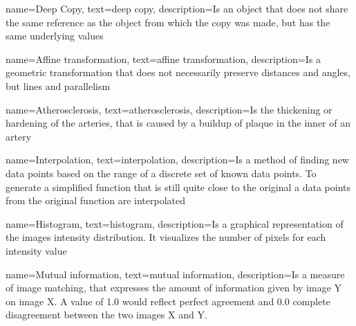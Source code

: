 {
        name=Deep Copy,
        text=deep copy,
        description={Is an object that does not share the same reference as the object from which the copy was made, but has the same underlying values}
}

{
        name=Affine transformation,
        text=affine transformation,
        description={Is a geometric transformation that does not necessarily preserve distances and angles, but lines and parallelism}
}

{
        name=Atherosclerosis,
        text=atherosclerosis,
        description={Is the thickening or hardening of the arteries, that is caused by a buildup of plaque in the inner of an artery}
}

{
        name=Interpolation,
        text=interpolation,
        description={Is a method of finding new data points based on the range of a discrete set of known data points. To generate a simplified function that is still quite close to the original a data points from the original function are interpolated}
}

{
        name=Histogram,
        text=histogram,
        description={Is a graphical representation of the images intensity distribution. It visualizes the number of pixels for each intensity value}
}

{
        name=Mutual information,
        text=mutual information,
        description={Is a measure of image matching, that expresses the amount of information given by image Y on image X. A value of 1.0 would reflect perfect agreement and 0.0 complete disagreement between the two images X and Y.}
}
